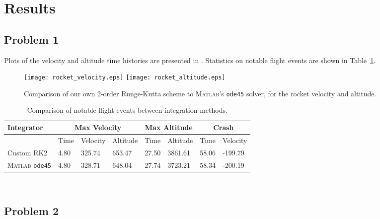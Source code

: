 \documentclass[12pt]{article}
\begin{document}
\section{Results} %

\subsection{Problem 1}

Plots of the velocity and altitude time histories are presented in . Statistics on notable flight events are shown in Table~\ref{tbl:rocket}.

\begin{figure}[t]
\begin{center}
\texttt{[image: rocket\_velocity.eps]}
\texttt{[image: rocket\_altitude.eps]}
\\[6pt]
\caption{Comparison of our own 2\nd-order Runge-Kutta scheme to \textsc{Matlab}'s \lstinline|ode45| solver, for the rocket velocity and altitude.}
\label{fig:rocket_plots}
\end{center}
\end{figure}

\begin{table}[t]
\centering
\begin{tabular}{llllllll}
\toprule
Integrator   & \multicolumn{3}{c}{Max Velocity} & \multicolumn{2}{c}{Max Altitude} & \multicolumn{2}{c}{Crash} \\
\midrule
~            & Time & Velocity & Altitude       & Time         & Altitude & Time  & Velocity \\
Custom RK2                        & 4.80 & 325.74   & 653.47  & 27.50  & 3861.61  & 58.06 & -199.79  \\
\textsc{Matlab} \lstinline|ode45| & 4.80 & 328.71   & 648.04  & 27.74  & 3723.21  & 58.34 & -200.19 \\
\bottomrule
\end{tabular}
\\[6pt]
\caption{Comparison of notable flight events between integration methods.}
\label{tbl:rocket}
\end{table}

\subsection{Problem 2}
\end{document}
